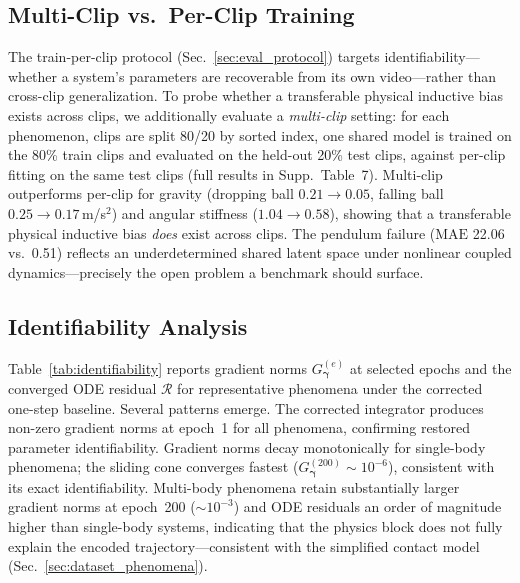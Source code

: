 \documentclass[runningheads]{llncs}
\begin{document}
\subsection{Multi-Clip vs.\ Per-Clip Training}
\label{sec:exp_multiclip}

The train-per-clip protocol (Sec.~\ref{sec:eval_protocol}) targets identifiability---whether a system's parameters are recoverable from its own video---rather than cross-clip generalization. To probe whether a transferable physical inductive bias exists across clips, we additionally evaluate a \emph{multi-clip} setting: for each phenomenon, clips are split 80/20 by sorted index, one shared model is trained on the 80\% train clips and evaluated on the held-out 20\% test clips, against per-clip fitting on the same test clips (full results in Supp.\ Table~7). Multi-clip outperforms per-clip for gravity (dropping ball $0.21{\to}0.05$, falling ball $0.25{\to}0.17$\,m/s$^2$) and angular stiffness ($1.04{\to}0.58$), showing that a transferable physical inductive bias \emph{does} exist across clips. The pendulum failure ($\mathrm{MAE}$ 22.06 vs.\ 0.51) reflects an underdetermined shared latent space under nonlinear coupled dynamics---precisely the open problem a benchmark should surface.

\subsection{Identifiability Analysis}
\label{sec:exp_identifiability}

Table~\ref{tab:identifiability} reports gradient norms $G_{\boldsymbol{\gamma}}^{(e)}$ at selected epochs and the converged ODE residual $\mathcal{R}$ for representative phenomena under the corrected one-step baseline. Several patterns emerge. The corrected integrator produces non-zero gradient norms at epoch~1 for all phenomena, confirming restored parameter identifiability. Gradient norms decay monotonically for single-body phenomena; the sliding cone converges fastest ($G_{\boldsymbol{\gamma}}^{(200)} \sim 10^{-6}$), consistent with its exact identifiability. Multi-body phenomena retain substantially larger gradient norms at epoch~200 ($\sim 10^{-3}$) and ODE residuals an order of magnitude higher than single-body systems, indicating that the physics block does not fully explain the encoded trajectory---consistent with the simplified contact model (Sec.~\ref{sec:dataset_phenomena}).
\end{document}
